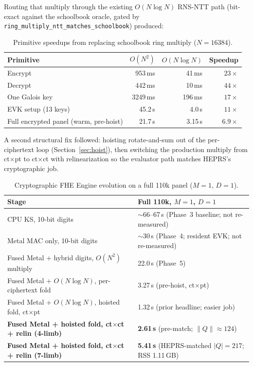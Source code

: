 \documentclass[11pt,a4paper]{article}
\DeclareRobustCommand{\code}[1]{\texttt{#1}}
\begin{document}
Routing that multiply through the existing $O(N \log N)$ RNS-NTT path
(bit-exact against the schoolbook oracle, gated by
\code{ring\_multiply\_ntt\_matches\_schoolbook}) produced:

\begin{table}[ht]
\centering
\caption{Primitive speedups from replacing schoolbook ring multiply
  ($N{=}16384$).}
\label{tab:ntt-mul}
\small
\begin{tabular}{@{}lrrr@{}}
\toprule
Primitive & $O(N^2)$ & $O(N\log N)$ & Speedup \\
\midrule
Encrypt & 953\,ms & 41\,ms & $23\times$ \\
Decrypt & 442\,ms & 10\,ms & $44\times$ \\
One Galois key & 3249\,ms & 196\,ms & $17\times$ \\
EVK setup (13 keys) & 45.2\,s & 4.0\,s & $11\times$ \\
Full encrypted panel (warm, pre-hoist) & 21.7\,s & 3.15\,s & $6.9\times$ \\
\bottomrule
\end{tabular}
\end{table}

A second structural fix followed: hoisting rotate-and-sum out of the
per-ciphertext loop (Section~\ref{sec:hoist}), then switching the production
multiply from ct$\times$pt to ct$\times$ct with relinearization so the evaluator
path matches HEPRS's cryptographic job.

\begin{table}[ht]
\centering
\caption{Cryptographic FHE Engine evolution on a full 110k panel ($M{=}1$, $D{=}1$).}
\label{tab:fhe-evol}
\small
\begin{tabularx}{\textwidth}{@{}>{\raggedright\arraybackslash}p{5.4cm}X@{}}
\toprule
Stage & Full 110k, $M{=}1$, $D{=}1$ \\
\midrule
CPU KS, 10-bit digits
  & $\sim$66--67\,s (Phase~3 baseline; not re-measured) \\
Metal MAC only, 10-bit digits
  & $\sim$30\,s (Phase~4; resident EVK; not re-measured) \\
Fused Metal + hybrid digits, $O(N^2)$ multiply
  & 22.0\,s (Phase~5) \\
Fused Metal + $O(N\log N)$, per-ciphertext fold
  & 3.27\,s (pre-hoist, ct$\times$pt) \\
Fused Metal + $O(N\log N)$, hoisted fold, ct$\times$pt
  & 1.32\,s (prior headline; easier job) \\
\textbf{Fused Metal + hoisted fold, ct$\times$ct + relin (4-limb)}
  & \textbf{2.61\,s} (pre-match; $\|Q\|\approx 124$) \\
\textbf{Fused Metal + hoisted fold, ct$\times$ct + relin (7-limb)}
  & \textbf{5.41\,s} (HEPRS-matched $|Q|{=}217$; RSS 1.11\,GB) \\
\bottomrule
\end{tabularx}
\end{table}
\end{document}
